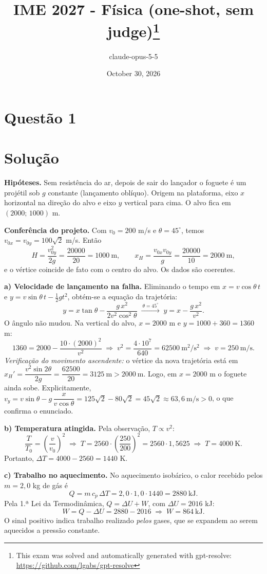\documentclass{article}%
\title{IME 2027 - Física (one-shot, sem judge)\thanks{This exam was solved and automatically generated with gpt-resolve: \url{https://github.com/lgabs/gpt-resolve}}}%
\author{claude{-}opus{-}5{-}5}%
\date{October 30, 2026}%
\begin{document}
%
\normalsize%
\maketitle%
\section*{Questão 1}

\section*{Solução}

\textbf{Hipóteses.} Sem resistência do ar, depois de sair do lançador o foguete é um projétil sob $g$ constante (lançamento oblíquo). Origem na plataforma, eixo $x$ horizontal na direção do alvo e eixo $y$ vertical para cima. O alvo fica em $(2000;\,1000)$ m.

\textbf{Conferência do projeto.} Com $v_0=200$ m/s e $\theta=45^\circ$, temos $v_{0x}=v_{0y}=100\sqrt2$ m/s. Então
\[
H=\frac{v_{0y}^2}{2g}=\frac{20000}{20}=1000\ \text{m},\qquad
x_H=\frac{v_{0x}v_{0y}}{g}=\frac{20000}{10}=2000\ \text{m},
\]
e o vértice coincide de fato com o centro do alvo. Os dados são coerentes.

\textbf{a) Velocidade de lançamento na falha.} Eliminando o tempo em $x=v\cos\theta\,t$ e $y=v\sin\theta\,t-\tfrac12gt^2$, obtém-se a equação da trajetória:
\[
y=x\tan\theta-\frac{g\,x^2}{2v^2\cos^2\theta}\;\xrightarrow{\ \theta=45^\circ\ }\; y=x-\frac{g\,x^2}{v^2}.
\]
O ângulo não mudou. Na vertical do alvo, $x=2000$ m e $y=1000+360=1360$ m:
\[
1360=2000-\frac{10\cdot(2000)^2}{v^2}\;\Rightarrow\; v^2=\frac{4\cdot 10^{7}}{640}=62500\ \text{m}^2/\text{s}^2
\;\Rightarrow\; \boxed{v=250\ \text{m/s}}.
\]
\emph{Verificação do movimento ascendente:} o vértice da nova trajetória está em $x_H'=\dfrac{v^2\sin 2\theta}{2g}=\dfrac{62500}{20}=3125\ \text{m}>2000\ \text{m}$. Logo, em $x=2000$ m o foguete ainda sobe. Explicitamente, $v_y=v\sin\theta-g\,\dfrac{x}{v\cos\theta}=125\sqrt2-80\sqrt2=45\sqrt2\approx 63{,}6\ \text{m/s}>0$, o que confirma o enunciado.

\textbf{b) Temperatura atingida.} Pela observação, $T\propto v^2$:
\[
\frac{T}{T_0}=\left(\frac{v}{v_0}\right)^2\;\Rightarrow\;
T=2560\cdot\left(\frac{250}{200}\right)^2=2560\cdot 1{,}5625\;\Rightarrow\;\boxed{T=4000\ \text{K}}.
\]
Portanto, $\Delta T=4000-2560=1440$ K.

\textbf{c) Trabalho no aquecimento.} No aquecimento isobárico, o calor recebido pelos $m=2{,}0$ kg de gás é
\[
Q=m\,c_p\,\Delta T=2{,}0\cdot 1{,}0\cdot 1440=2880\ \text{kJ}.
\]
Pela 1.ª Lei da Termodinâmica, $Q=\Delta U+W$, com $\Delta U=2016$ kJ:
\[
W=Q-\Delta U=2880-2016\;\Rightarrow\;\boxed{W=864\ \text{kJ}}.
\]
O sinal positivo indica trabalho realizado \emph{pelos} gases, que se expandem ao serem aquecidos a pressão constante.
\end{document}
